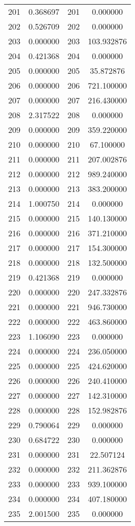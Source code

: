 \documentclass[12pt]{article}
\begin{document}
\begin{longtable}{@{}cccc@{}}
201 & 0.368697 & 201 & 0.000000 \\
202 & 0.526709 & 202 & 0.000000 \\
203 & 0.000000 & 203 & 103.932876 \\
204 & 0.421368 & 204 & 0.000000 \\
205 & 0.000000 & 205 & 35.872876 \\
206 & 0.000000 & 206 & 721.100000 \\
207 & 0.000000 & 207 & 216.430000 \\
208 & 2.317522 & 208 & 0.000000 \\
209 & 0.000000 & 209 & 359.220000 \\
210 & 0.000000 & 210 & 67.100000 \\
211 & 0.000000 & 211 & 207.002876 \\
212 & 0.000000 & 212 & 989.240000 \\
213 & 0.000000 & 213 & 383.200000 \\
214 & 1.000750 & 214 & 0.000000 \\
215 & 0.000000 & 215 & 140.130000 \\
216 & 0.000000 & 216 & 371.210000 \\
217 & 0.000000 & 217 & 154.300000 \\
218 & 0.000000 & 218 & 132.500000 \\
219 & 0.421368 & 219 & 0.000000 \\
220 & 0.000000 & 220 & 247.332876 \\
221 & 0.000000 & 221 & 946.730000 \\
222 & 0.000000 & 222 & 463.860000 \\
223 & 1.106090 & 223 & 0.000000 \\
224 & 0.000000 & 224 & 236.050000 \\
225 & 0.000000 & 225 & 424.620000 \\
226 & 0.000000 & 226 & 240.410000 \\
227 & 0.000000 & 227 & 142.310000 \\
228 & 0.000000 & 228 & 152.982876 \\
229 & 0.790064 & 229 & 0.000000 \\
230 & 0.684722 & 230 & 0.000000 \\
231 & 0.000000 & 231 & 22.507124 \\
232 & 0.000000 & 232 & 211.362876 \\
233 & 0.000000 & 233 & 939.100000 \\
234 & 0.000000 & 234 & 407.180000 \\
235 & 2.001500 & 235 & 0.000000 \\

\end{longtable}
\end{document}
